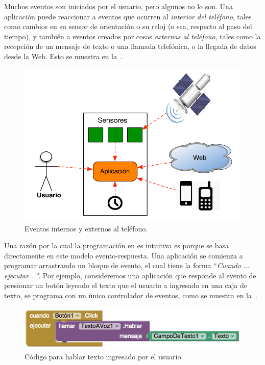 \documentclass[letterpaper]{article}
\begin{document}
Muchos eventos son iniciados por el usuario, pero algunos no lo
son. Una aplicación puede reaccionar a eventos que ocurren al
\emph{interior del teléfono}, tales como cambios en su sensor de
orientación o su reloj (o sea, respecto al paso del tiempo), y también
a eventos creados por cosas \emph{externas al teléfono}, tales como la
recepción de un mensaje de texto o una llamada telefónica, o la
llegada de datos desde la Web. Esto se muestra en
la~.

\begin{figure}[H]
\centering
\includegraphics[scale=0.5]{figures/Events}
\caption{Eventos internos y externos al teléfono.}
\label{fig:events}
\end{figure}

Una razón por la cual la programación en \AppInventor es intuitiva es
porque se basa directamente en este modelo evento-respuesta. Una
aplicación se comienza a programar arrastrando un bloque de evento, el
cual tiene la forma ``\emph{Cuando} ... \emph{ejecutar} ...''. Por ejemplo,
consideremos una aplicación que responde al evento de presionar un
botón leyendo el texto que el usuario a ingresado en una caja de
texto, se programa con un único controlador de eventos, como se
muestra en la~.

\begin{figure}[H]
\centering
\includegraphics[scale=0.5]{figures/SpeakIt1}
\caption{Código para hablar texto ingresado por el usuario.}
\label{fig:speakit1}
\end{figure}
\end{document}
